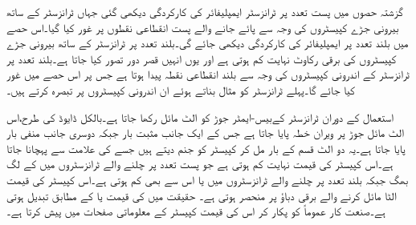 گزشتہ حصوں میں پست تعدد پر ٹرانزسٹر ایمپلیفائر کی کارکردگی دیکھی گئی جہاں ٹرانزسٹر کے ساتھ بیرونی جڑے کپیسٹروں کی وجہ سے پائے جانے والے پست انقطاعی نقطوں پر غور کیا گیا۔اس حصے میں بلند تعدد پر ایمپلیفائر کی کارکردگی دیکھی جائے گی۔بلند تعدد پر ٹرانزسٹر کے ساتھ بیرونی جڑے کپیسٹروں کی برقی رکاوٹ   نہایت کم ہوتی ہے اور یوں انہیں قصر دور تصور کیا جاتا ہے۔بلند تعدد پر ٹرانزسٹر کے اندرونی کپیسٹروں کی وجہ سے بلند انقطاعی نقطہ  پیدا ہوتا ہے جس پر اس حصے میں غور کیا جائے گا۔پہلے  ٹرانزسٹر کو مثال بناتے ہوئے ان اندرونی کپیسٹروں پر تبصرہ کرتے ہیں۔

استعمال کے دوران ٹرانزسٹر کےبیس-ایمٹر    جوڑ  کو الٹ مائل رکھا جاتا ہے۔بالکل ڈایوڈ کی طرح،اس  الٹ مائل  جوڑ پر ویران خطہ پایا جاتا ہے جس کے ایک جانب مثبت بار جبکہ دوسری جانب منفی بار پایا جاتا ہے۔یہ دو الٹ قسم کے بار مل کر کپیسٹر کو جنم دیتے ہیں جسے  کی علامت سے پہچانا جاتا ہے۔اس کپیسٹر کی قیمت نہایت کم ہوتی ہے جو پست تعدد پر چلنے والے ٹرانزسٹروں میں  کے لگ بھگ  جبکہ بلند تعدد پر چلنے والے ٹرانزسٹروں میں  یا اس سے بھی کم ہوتی ہے۔اس کپیسٹر کی قیمت الٹا مائل کرنے والے برقی دباؤ  پر منحصر ہوتی ہے۔ حقیقت میں  کی قیمت  یا   کے مطابق  تبدیل ہوتی ہے۔صنعت کار عموماً  کو  پکار کر اس کی قیمت کپیسٹر کے معلوماتی صفحات میں پیش کرتا ہے۔

